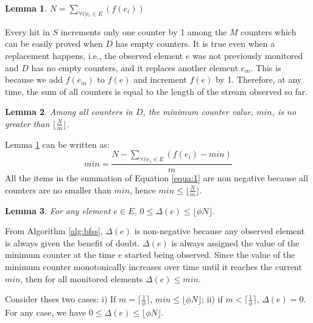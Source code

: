 \documentclass[conference]{IEEEtran}
\begin{document}
\newtheorem{lemma}{Lemma}
\begin{lemma}\label{lem:1}
  $N=\sum_{\forall i|e_i \in E}(f(e_i))$
\end{lemma}

\begin{IEEEproof}
Every hit in $S$ increments only one counter by 1 among the $M$ counters which can be easily proved when $D$ has empty counters. It is true even when a replacement happens, i.e., the observed element $e$ was not previously monitored and $D$ has no empty counters, and it replaces another element $e_m$. This is because we add $f(e_m)$ to $f(e)$ and increment $f(e)$ by 1. Therefore, at any time, the sum of all counters is equal to the length of the stream observed so far.
\end{IEEEproof}


\begin{lemma} \label{lem:2}
Among all counters in $D$, the minimum counter value, $min$, is no greater than $\lfloor\frac{N}{m}\rfloor$.
\end{lemma}

\begin{IEEEproof}
Lemma \ref{lem:1} can be written as:
\begin{equation}\label{equa:1}
	min=\frac{N-\sum_{\forall i|e_i \in E}(f(e_i)-min)}{m}
\end{equation}
\indent All the items in the summation of Equation \ref{equa:1} are non negative because all counters are no smaller than $min$, hence $min\leq\lfloor \frac{N}{m}\rfloor$.
\end{IEEEproof}

\begin{lemma}\label{lem:3}
	For any element $e \in E$, $0 \leq \Delta(e) \leq \lfloor\phi N\rfloor$. 
\end{lemma}

\begin{IEEEproof}
From Algorithm \ref{alg:bfss}, $\Delta(e)$ is non-negative because any observed element is always given the benefit of doubt. $\Delta(e)$ is always assigned the value of the minimum counter at the time $e$ started being observed. Since the value of the minimum counter monotonically increases over time until it reaches the current $min$, then for all monitored elements $\Delta(e) \leq min$.\par
Consider thses two cases: i) If $m=\lceil \frac{1}{\phi}\rceil$, $min\leq \lfloor\phi N\rfloor$; ii) if $m<\lceil \frac{1}{\phi}\rceil$, $\Delta(e)=0$. For any case, we have $0 \leq \Delta(e) \leq \lfloor\phi N\rfloor$.
\end{IEEEproof}
\end{document}
